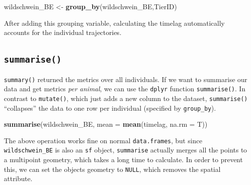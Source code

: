 \documentclass[]{book}
\newenvironment{Shaded}{\begin{snugshade}}{\end{snugshade}}
\newcommand{\CommentTok}[1]{\textcolor[rgb]{0.56,0.35,0.01}{\textit{#1}}}
\newcommand{\DataTypeTok}[1]{\textcolor[rgb]{0.13,0.29,0.53}{#1}}
\newcommand{\KeywordTok}[1]{\textcolor[rgb]{0.13,0.29,0.53}{\textbf{#1}}}
\newcommand{\NormalTok}[1]{#1}
\newcommand{\OperatorTok}[1]{\textcolor[rgb]{0.81,0.36,0.00}{\textbf{#1}}}
\newcommand{\StringTok}[1]{\textcolor[rgb]{0.31,0.60,0.02}{#1}}
\begin{document}
\begin{Shaded}
\begin{Highlighting}[]
\NormalTok{wildschwein_BE <-}\StringTok{ }\KeywordTok{group_by}\NormalTok{(wildschwein_BE,TierID)}
\end{Highlighting}
\end{Shaded}

After adding this grouping variable, calculating the timelag automatically accounts for the individual trajectories.

\begin{Shaded}
\end{Shaded}

\hypertarget{summarise}{%
\subsection{\texorpdfstring{\texttt{summarise()}}{summarise()}}\label{summarise}}

\texttt{summary()} returned the metrics over all individuals. If we want to summarise our data and get metrics \emph{per animal}, we can use the \texttt{dplyr} function \texttt{summarise()}. In contrast to \texttt{mutate()}, which just adds a new column to the dataset, \texttt{summarise()} ``collapses'' the data to one row per individual (specified by \texttt{group\_by}).

\begin{Shaded}
\begin{Highlighting}[]
\KeywordTok{summarise}\NormalTok{(wildschwein_BE, }\DataTypeTok{mean =} \KeywordTok{mean}\NormalTok{(timelag, }\DataTypeTok{na.rm =}\NormalTok{ T))}
\end{Highlighting}
\end{Shaded}

The above operation works fine on normal \texttt{data.frames}, but since \texttt{wildschwein\_BE} is also an \texttt{sf} object, \texttt{summarise} actually merges all the points to a multipoint geometry, which takes a long time to calculate. In order to prevent this, we can set the objects geometry to \texttt{NULL}, which removes the spatial attribute.
\end{document}

